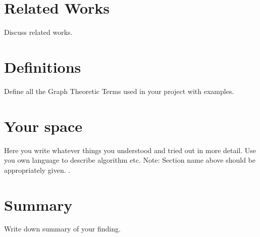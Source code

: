 \documentclass{article}
\begin{document}
\section{Related Works}
\label{sec:relWork}
Discuss related works.
\newpage

\section{Definitions}
\label{sec:def}
Define all the Graph Theoretic Terms used in your project with examples.
\newpage


\section{Your space}
\label{sec:space}
Here you write whatever things you understood and tried out in more detail. Use you own language to describe algorithm etc. Note: Section name above should be appropriately given. 
\newpage
.
\newpage


\section{Summary}
\label{sec:summary}
Write down summary of your finding.



\end{document}
